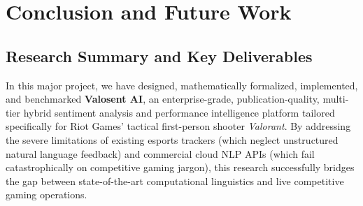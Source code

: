 \chapter{Conclusion and Future Work}
\label{chap:conclusion}

\section{Research Summary and Key Deliverables}
\label{sec:conclusion_summary}

In this major project, we have designed, mathematically formalized, implemented, and benchmarked \textbf{Valosent AI}, an enterprise-grade, publication-quality, multi-tier hybrid sentiment analysis and performance intelligence platform tailored specifically for Riot Games' tactical first-person shooter \textit{Valorant}. By addressing the severe limitations of existing esports trackers (which neglect unstructured natural language feedback) and commercial cloud NLP APIs (which fail catastrophically on competitive gaming jargon), this research successfully bridges the gap between state-of-the-art computational linguistics and live competitive gaming operations.

